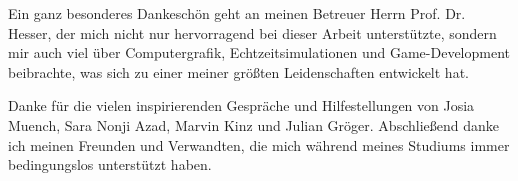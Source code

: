 Ein ganz besonderes Dankeschön geht an meinen Betreuer Herrn Prof. Dr. Hesser, der mich nicht nur hervorragend bei dieser Arbeit unterstützte, sondern mir auch viel über Computergrafik, Echtzeitsimulationen und Game-Development beibrachte, was sich zu einer meiner größten Leidenschaften entwickelt hat.

Danke für die vielen inspirierenden Gespräche und Hilfestellungen von Josia Muench, Sara Nonji Azad, Marvin Kinz und Julian Gröger. Abschließend danke ich meinen Freunden und Verwandten, die mich während meines Studiums immer bedingungslos unterstützt haben.

